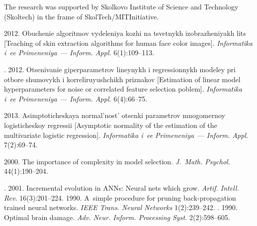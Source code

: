 


\Ack
\noindent
The research was supported by Skolkovo Institute of Science and Technology
(Skoltech) in the frame of SkolTech/MITInitiative.



  \begin{multicols}{2}

\renewcommand{\bibname}{\protect\rmfamily References}



{\small\frenchspacing
 {%
 \begin{thebibliography}{99}

2012.
Obuchenie algoritmov vydeleniya kozhi na tsvetnykh izobrazheniyakh lits
[Teaching of skin extraction algorithms for human face color images].
\textit{Informatika i~ee Primeneniya}~--- \textit{Inform. Appl.} 6(1):109--113.



.
2012. Otsenivanie giperparametrov lineynykh i regressionnykh modeley
pri otbore shumovykh i korreliruyushchikh priznakov
[Estimation of linear model hyperparameters for noise or correlated
feature selection poblem].
\textit{Informatika i~ee Primeneniya}~--- \textit{Inform. Appl.} 6(4):66--75.

2013. Asimptoticheskaya normal'nost' otsenki parametrov mnogomernoy
logisticheskoy regressii
[Asymptotic normality of the estimation of the multivariate logistic
regression]. \textit{Informatika i~ee Primeneniya}~--- \textit{Inform. Appl.} 7(2):69--74.


 2000. The
importance of complexity in model selection.
\textit{J.~Math. Psychol.} 44(1):190--204.

. 2001.
Incremental evolution in ANNs: Neural nets which grow.
\textit{Artif. Intell. Rev.} 16(3):201--224.
 1990. A~simple procedure for pruning back-propagation
trained neural networks. \textit{IEEE Trans. Neural Networks} 1(2):239--242.
.
1990. Optimal brain damage. \textit{Adv. Neur. Inform. Processing
Syst.} 2(2):598--605.


\end{thebibliography}}}
\end{multicols}
